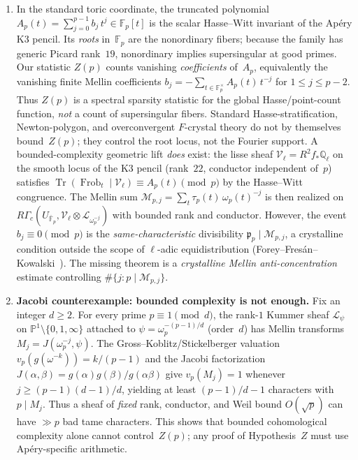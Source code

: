 \documentclass[11pt]{article}
\theoremstyle{definition}
\theoremstyle{remark}
\begin{document}
\begin{enumerate}
\item In the standard toric coordinate, the truncated
polynomial
$A_p(t) = \sum_{j=0}^{p-1} b_j\, t^j \in \mathbb{F}_p[t]$
is the scalar Hasse--Witt invariant of the
Ap\'ery K3 pencil.
Its \emph{roots} in~$\mathbb{F}_p$ are the
nonordinary fibers; because the family
has generic Picard rank~$19$, nonordinary
implies supersingular at good primes.
Our statistic $Z(p)$ counts vanishing
\emph{coefficients} of~$A_p$, equivalently
the vanishing finite Mellin coefficients
$b_j = -\sum_{t \in \mathbb{F}_p^\times} A_p(t)\, t^{-j}$
for $1 \le j \le p - 2$.
Thus $Z(p)$ is a spectral sparsity statistic
for the global Hasse/point-count function,
\emph{not} a count of supersingular fibers.
Standard Hasse-stratification, Newton-polygon,
and overconvergent $F$-crystal theory
do not by themselves bound~$Z(p)$;
they control the root locus, not the
Fourier support.
A bounded-complexity geometric lift \emph{does}
exist: the lisse sheaf
$\mathcal{V}_\ell = R^2f_*\mathbb{Q}_\ell$
on the smooth locus of the K3 pencil
(rank~$22$, conductor independent of~$p$)
satisfies $\operatorname{Tr}(\operatorname{Frob}_t
\mid \mathcal{V}_\ell) \equiv A_p(t) \pmod{p}$
by the Hasse--Witt congruence.
The Mellin sum $\mathscr{M}_{p,j}
= \sum_t \tau_p(t)\,\omega_p(t)^{-j}$
is then realized on
$R\Gamma_c(U_{\bar{\mathbb{F}}_p},
\mathcal{V}_\ell \otimes \mathcal{L}_{\omega_p^{-j}})$
with bounded rank and conductor.
However, the event $b_j \equiv 0 \pmod{p}$
is the \emph{same-characteristic} divisibility
$\mathfrak{p}_p \mid \mathscr{M}_{p,j}$,
a crystalline condition outside the scope of
$\ell$-adic equidistribution
(Forey--Fres\'an--Kowalski~\cite{FFK2023}).
The missing theorem is a
\emph{crystalline Mellin anti-concentration}
estimate controlling $\#\{j : p \mid
\mathscr{M}_{p,j}\}$.

\item \textbf{Jacobi counterexample: bounded complexity is
  not enough.}
Fix an integer $d \ge 2$.
For every prime $p \equiv 1 \pmod{d}$,
the rank-$1$ Kummer sheaf
$\mathcal{L}_{\psi}$ on
$\mathbb{P}^1 \setminus \{0,1,\infty\}$
attached to $\psi = \omega_p^{-(p-1)/d}$
(order~$d$)
has Mellin transforms
$M_j = J(\omega_p^{-j}, \psi)$.
The Gross--Koblitz/Stickelberger valuation
$v_p(g(\omega^{-k})) = k/(p{-}1)$
and the Jacobi factorization
$J(\alpha,\beta) = g(\alpha)g(\beta)/g(\alpha\beta)$
give $v_p(M_j) = 1$ whenever
$j \ge (p{-}1)(d{-}1)/d$,
yielding at least $(p{-}1)/d - 1$
characters with $p \mid M_j$.
Thus a sheaf of \emph{fixed} rank, conductor,
and Weil bound $O(\sqrt{p})$ can have
$\gg p$ bad tame characters.
This shows that bounded cohomological
complexity alone cannot control~$Z(p)$;
any proof of Hypothesis~$Z$ must use
Ap\'ery-specific arithmetic.


\end{enumerate}
\end{document}
